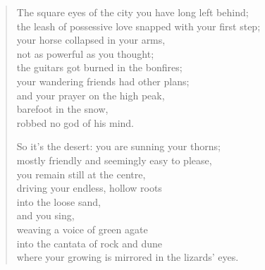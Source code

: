 \begin{verse}

The square eyes of the city you have long left behind;\\
the leash of possessive love snapped with your first step;\\
your horse collapsed in your arms,\\
not as powerful as you thought;\\
the guitars got burned in the bonfires;\\
your wandering friends had other plans;\\
and your prayer on the high peak,\\
barefoot in the snow,\\
robbed no god of his mind.

So it's the desert: you are sunning your thorns;\\
mostly friendly and seemingly easy to please,\\
you remain still at the centre,\\
driving your endless, hollow roots\\
into the loose sand,\\
and you sing,\\
weaving a voice of green agate\\
into the cantata of rock and dune\\
where your growing is mirrored in the lizards' eyes.

\end{verse}

